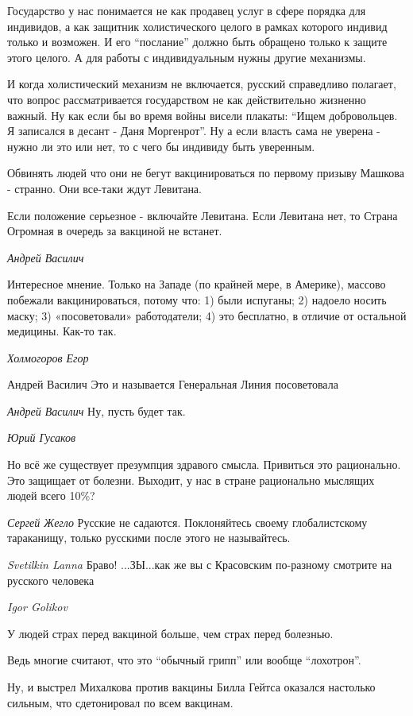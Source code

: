 Государство у нас понимается не как продавец услуг в сфере порядка для
индивидов, а как защитник холистического целого в рамках которого индивид
только и возможен. И его \enquote{послание} должно быть обращено только к защите этого
целого. А для работы с индивидуальным нужны другие механизмы.

И когда холистический механизм не включается, русский справедливо полагает, что
вопрос рассматривается государством не как действительно жизненно важный. Ну
как если бы во время войны висели плакаты: \enquote{Ищем добровольцев. Я
записался в десант - Даня Моргенрот}. Ну а если власть сама не уверена - нужно
ли это или нет, то с чего бы индивиду быть уверенным. 

Обвинять людей что они не бегут вакцинироваться по первому призыву Машкова -
странно. Они все-таки ждут Левитана.

Если положение серьезное - включайте Левитана. Если Левитана нет, то Страна
Огромная в очередь за вакциной не встанет.

\emph{Андрей Василич}

Интересное мнение. Только на Западе (по крайней мере, в Америке), массово
побежали вакцинироваться, потому что: 1) были испуганы; 2) надоело носить
маску; 3) «посоветовали» работодатели; 4) это бесплатно, в отличие от остальной
медицины. Как-то так.

\emph{Холмогоров Егор}

Андрей Василич
Это и называется Генеральная Линия посоветовала

\emph{Андрей Василич}
Ну, пусть будет так.

\emph{Юрий Гусаков}

Но всё же существует презумпция здравого смысла. Привиться это рационально. Это
защищает от болезни. Выходит, у нас в стране рационально мыслящих людей всего
10\%?

\emph{Сергей Жегло}
Русские не садаются. Поклоняйтесь своему глобалистскому тараканищу, только русскими после этого не называйтесь.

\emph{Svetilkin Lanna}
Браво! ...ЗЫ...как же вы с Красовским по-разному смотрите на русского человека

\emph{Igor Golikov}

У людей страх перед вакциной больше, чем страх перед болезнью.

Ведь многие считают, что это \enquote{обычный грипп} или вообще \enquote{лохотрон}.

Ну, и выстрел Михалкова против вакцины Билла Гейтса оказался настолько сильным, что сдетонировал по всем вакцинам.


